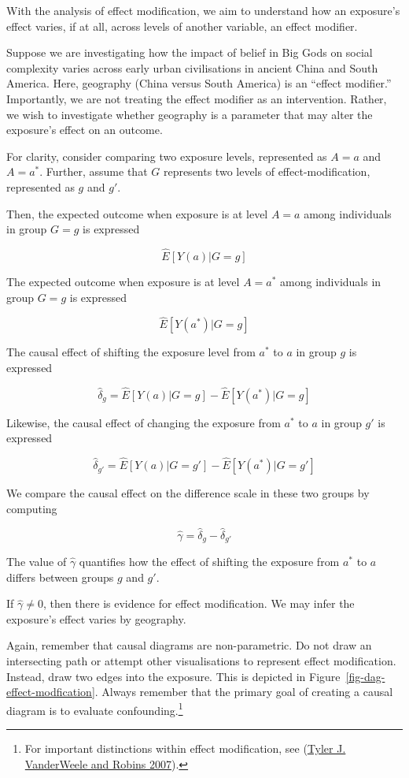 \documentclass[
  singlecolumn]{report}
\begin{document}
With the analysis of effect modification, we aim to understand how an
exposure's effect varies, if at all, across levels of another variable,
an effect modifier.

Suppose we are investigating how the impact of belief in Big Gods on
social complexity varies across early urban civilisations in ancient
China and South America. Here, geography (China versus South America) is
an ``effect modifier.'' Importantly, we are not treating the effect
modifier as an intervention. Rather, we wish to investigate whether
geography is a parameter that may alter the exposure's effect on an
outcome.

For clarity, consider comparing two exposure levels, represented as
\(A = a\) and \(A= a^*\). Further, assume that \(G\) represents two
levels of effect-modification, represented as \(g\) and \(g'\).

Then, the expected outcome when exposure is at level \(A=a\) among
individuals in group \(G=g\) is expressed

\[\hat{E}[Y(a)|G=g]\]

The expected outcome when exposure is at level \(A=a^*\) among
individuals in group \(G=g\) is expressed

\[\hat{E}[Y(a^*)|G=g]\]

The causal effect of shifting the exposure level from \(a^*\) to \(a\)
in group \(g\) is expressed

\[\hat{\delta}_g = \hat{E}[Y(a)|G=g] - \hat{E}[Y(a^*)|G=g]\]

Likewise, the causal effect of changing the exposure from \(a^*\) to
\(a\) in group \(g'\) is expressed

\[\hat{\delta}_{g'} = \hat{E}[Y(a)|G=g'] - \hat{E}[Y(a^*)|G=g']\]

We compare the causal effect on the difference scale in these two groups
by computing

\[\hat{\gamma} = \hat{\delta}_g - \hat{\delta}_{g'}\]

The value of \(\hat{\gamma}\) quantifies how the effect of shifting the
exposure from \(a^*\) to \(a\) differs between groups \(g\) and \(g'\).

If \(\hat{\gamma}\neq 0\), then there is evidence for effect
modification. We may infer the exposure's effect varies by geography.

Again, remember that causal diagrams are non-parametric. Do not draw an
intersecting path or attempt other visualisations to represent effect
modification. Instead, draw two edges into the exposure. This is
depicted in Figure~\ref{fig-dag-effect-modfication}. Always remember
that the primary goal of creating a causal diagram is to evaluate
confounding.\footnote{For important distinctions within effect
  modification, see (\protect\hyperlink{ref-vanderweele2007}{Tyler J.
  VanderWeele and Robins 2007}).}
\end{document}
